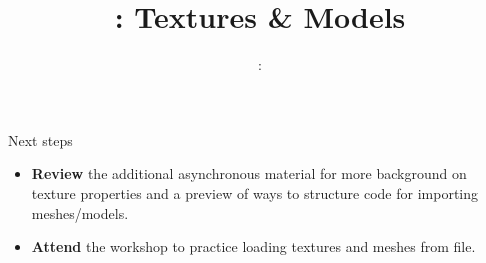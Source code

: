 \usepackage{../../beamerthemeFalmouthGamesAcademy}
\usepackage{multimedia}
\graphicspath{ {../../} }




\usepackage[normalem]{ulem}
\usepackage{wasysym}

\usepackage{pdfpages}

\usepackage{caption}
\captionsetup[figure]{font=scriptsize,labelfont=scriptsize}

\usetikzlibrary{arrows,automata}




\title{\sessionnumber: Textures \& Models}
\subtitle{\modulecode: \moduletitle}

\frame{\titlepage} 







\begin{frame}{Next steps}
	\begin{itemize}
		\item \textbf{Review} the additional asynchronous material for more background on texture properties and a preview of ways to structure code for importing meshes/models.
		\item \textbf{Attend} the workshop to practice loading textures and meshes from file.
	\end{itemize}
\end{frame}



